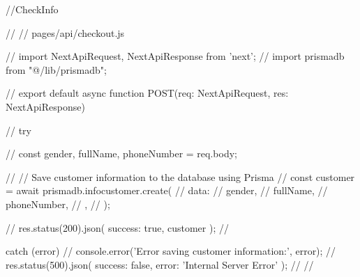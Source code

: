 //CheckInfo

// // pages/api/checkout.js

// import { NextApiRequest, NextApiResponse } from 'next';
// import prismadb from "@/lib/prismadb";

// export default async function POST(req: NextApiRequest, res: NextApiResponse) {
//     try {
//       const { gender, fullName, phoneNumber } = req.body;

//       // Save customer information to the database using Prisma
//       const customer = await prismadb.infocustomer.create({
//         data: {
//           gender,
//           fullName,
//           phoneNumber,
//         },
//       });

//       res.status(200).json({ success: true, customer });
//     } catch (error) {
//       console.error('Error saving customer information:', error);
//       res.status(500).json({ success: false, error: 'Internal Server Error' });
//     }
// }



















































